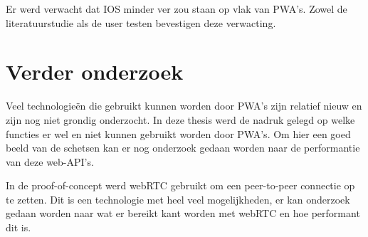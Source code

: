 	Er werd verwacht dat IOS minder ver zou staan op vlak van PWA's. Zowel de literatuurstudie als de user testen bevestigen deze verwacting.
	

\section{Verder onderzoek}
	Veel technologieën die gebruikt kunnen worden door PWA's zijn relatief nieuw en zijn nog niet grondig onderzocht.
	In deze thesis werd de nadruk gelegd op welke functies er wel en niet kunnen gebruikt worden door PWA's. Om hier een goed beeld van de schetsen kan er nog onderzoek gedaan worden naar de performantie van deze web-API's.
	
	In de proof-of-concept werd webRTC gebruikt om een peer-to-peer connectie op te zetten. Dit is een technologie met heel veel mogelijkheden, er kan onderzoek gedaan worden naar wat er bereikt kant worden met webRTC en hoe performant dit is.